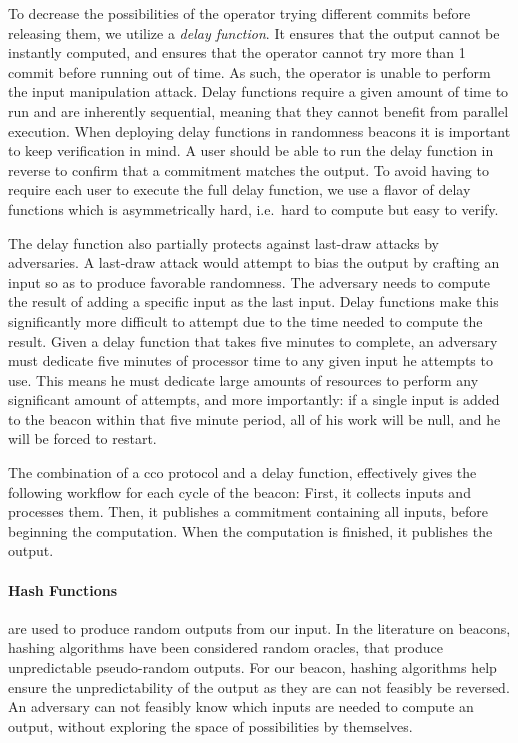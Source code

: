 To decrease the possibilities of the operator trying different commits before releasing them, we utilize a \emph{delay function}. It ensures that the output cannot be instantly computed, and ensures that the operator cannot try more than 1 commit before running out of time. As such, the operator is unable to perform the input manipulation attack.
Delay functions require a given amount of time to run and are inherently sequential, meaning that they cannot benefit from parallel execution.
When deploying delay functions in randomness beacons it is important to keep verification in mind.
A user should be able to run the delay function in reverse to confirm that a commitment matches the output.
To avoid having to require each user to execute the full delay function, we use a flavor of delay functions which is asymmetrically hard, i.e.\ hard to compute but easy to verify.

The delay function also partially protects against last-draw attacks by adversaries.
A last-draw attack would attempt to bias the output by crafting an input so as to produce favorable randomness.
The adversary needs to compute the result of adding a specific input as the last input.
Delay functions make this significantly more difficult to attempt due to the time needed to compute the result.
Given a delay function that takes five minutes to complete, an adversary must dedicate five minutes of processor time to any given input he attempts to use.
This means he must dedicate large amounts of resources to perform any significant amount of attempts, and more importantly: if a single input is added to the beacon within that five minute period, all of his work will be null, and he will be forced to restart.

The combination of a \gls{cco} protocol and a delay function, effectively gives the following workflow for each cycle of the beacon: First, it collects inputs and processes them.
Then, it publishes a commitment containing all inputs, before beginning the computation.
When the computation is finished, it publishes the output.

\paragraph{Hash Functions} are used to produce random outputs from our input.
In the literature on beacons, hashing algorithms have been considered random oracles, that produce unpredictable pseudo-random outputs.
For our beacon, hashing algorithms help ensure the unpredictability of the output as they are can not feasibly be reversed.
An adversary can not feasibly know which inputs are needed to compute an output, without exploring the space of possibilities by themselves.
